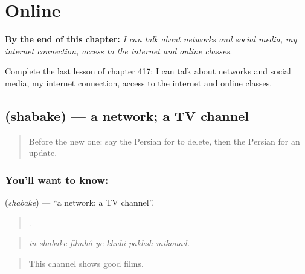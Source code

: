 
\chapter{Online}
\label{ch:fa-online}

\begin{chapteropening}
\textbf{By the end of this chapter:} \emph{I can talk about networks and social media, my internet connection, access to the internet and online classes.}

Complete the last lesson of chapter 417: I can talk about networks and social media, my internet connection, access to the internet and online classes.
\end{chapteropening}

\section[\texorpdfstring{\fa{شبکه} (shabake)}{شبکه (shabake)}]{ (shabake) — a network; a TV channel}

\label{lesson:FA-C417-shabake}



\begin{quote}
Before the new one: say the Persian for to delete, then the Persian for an update.
\end{quote}

\subsection*{You'll want to know: }
\textbf{} (\emph{shabake}) — \textquotedblleft{}a network; a TV channel\textquotedblright{}.

\begin{quote}
     .
\end{quote}

\begin{quote}
\emph{in shabake filmhâ-ye khubi pakhsh mikonad.}
\end{quote}

\begin{quote}
This channel shows good films.
\end{quote}

